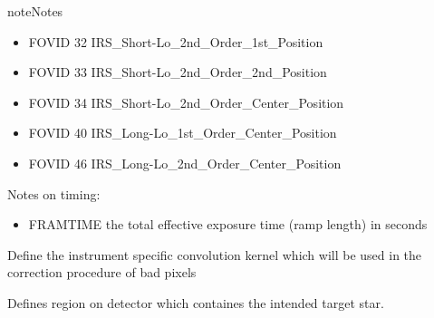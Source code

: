\documentclass[a4paper,10pt,english]{sphinxmanual}
\begin{document}
\begin{fulllineitems}
\begin{fulllineitems}
\begin{sphinxadmonition}{note}{Notes}
\begin{description}
\begin{itemize}
\item {} 
FOVID     32     IRS\_Short-Lo\_2nd\_Order\_1st\_Position

\item {} 
FOVID     33     IRS\_Short-Lo\_2nd\_Order\_2nd\_Position

\item {} 
FOVID     34     IRS\_Short-Lo\_2nd\_Order\_Center\_Position

\item {} 
FOVID     40     IRS\_Long-Lo\_1st\_Order\_Center\_Position

\item {} 
FOVID     46     IRS\_Long-Lo\_2nd\_Order\_Center\_Position

\end{itemize}

\end{description}

Notes on timing:
\begin{itemize}
\item {} 
FRAMTIME the total effective exposure time (ramp length)
in seconds

\end{itemize}
\end{sphinxadmonition}

\end{fulllineitems}


\begin{fulllineitems}
\label{\detokenize{cascade.instruments:cascade.instruments.instruments.SpitzerIRS._define_convolution_kernel}}
Define the instrument specific convolution kernel which will be used
in the correction procedure of bad pixels

\end{fulllineitems}


\begin{fulllineitems}
\label{\detokenize{cascade.instruments:cascade.instruments.instruments.SpitzerIRS._define_region_of_interest}}
Defines region on detector which containes the intended target star.


\end{fulllineitems}
\end{fulllineitems}
\end{document}
